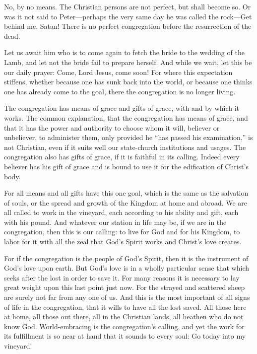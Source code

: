 No, by no means. The Christian persons are not perfect, but shall become so. Or was it not said to Peter—perhaps the very same day he was called the rock—Get behind me, Satan! There is no perfect congregation before the resurrection of the dead.

Let us await him who is to come again to fetch the bride to the wedding of the Lamb, and let not the bride fail to prepare herself. And while we wait, let this be our daily prayer: Come, Lord Jesus, come soon! For where this expectation stiffens, whether because one has sunk back into the world, or because one thinks one has already come to the goal, there the congregation is no longer living.

The congregation has means of grace and gifts of grace, with and by which it works. The common explanation, that the congregation has means of grace, and that it has the power and authority to choose whom it will, believer or unbeliever, to administer them, only provided he “has passed his examination,” is not Christian, even if it suits well our state-church institutions and usages. The congregation also has gifts of grace, if it is faithful in its calling. Indeed every believer has his gift of grace and is bound to use it for the edification of Christ’s body.

For all means and all gifts have this one goal, which is the same as the salvation of souls, or the spread and growth of the Kingdom at home and abroad. We are all called to work in the vineyard, each according to his ability and gift, each with his pound. And whatever our station in life may be, if we are in the congregation, then this is our calling: to live for God and for his Kingdom, to labor for it with all the zeal that God’s Spirit works and Christ’s love creates.

For if the congregation is the people of God’s Spirit, then it is the instrument of God’s love upon earth. But God’s love is in a wholly particular sense that which seeks after the lost in order to save it. For many reasons it is necessary to lay great weight upon this last point just now. For the strayed and scattered sheep are surely not far from any one of us. And this is the most important of all signs of life in the congregation, that it wills to have all the lost saved. All those here at home, all those out there, all in the Christian lands, all heathen who do not know God. World-embracing is the congregation’s calling, and yet the work for its fulfillment is so near at hand that it sounds to every soul: Go today into my vineyard!

